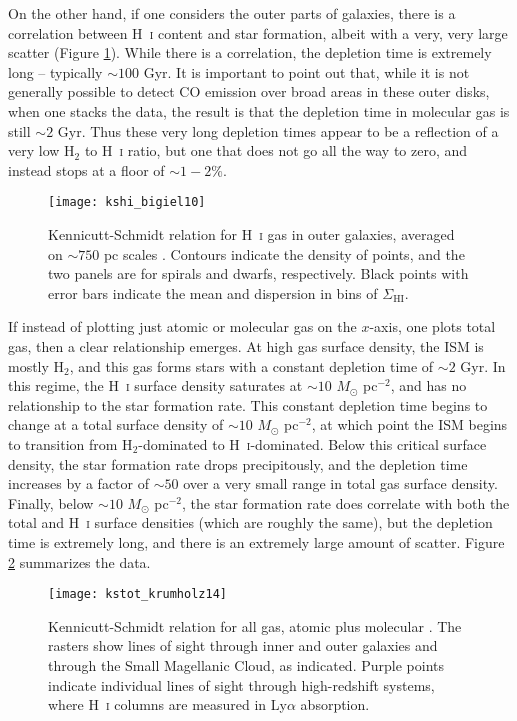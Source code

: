 On the other hand, if one considers the outer parts of galaxies, there is a correlation between H~\textsc{i} content and star formation, albeit with a very, very large scatter (Figure \ref{fig:kshi_bigiel10}). While there is a correlation, the depletion time is extremely long -- typically $\sim 100$ Gyr. It is important to point out that, while it is not generally possible to detect CO emission over broad areas in these outer disks, when one stacks the data, the result is that the depletion time in molecular gas is still $\sim 2$ Gyr. Thus these very long depletion times appear to be a reflection of a very low H$_2$ to H~\textsc{i} ratio, but one that does not go all the way to zero, and instead stops at a floor of $\sim 1-2\%$.

\begin{figure}
\texttt{[image: kshi\_bigiel10]}
\caption[Kennicutt-Schmidt relation for H~\textsc{i} gas in outer galaxies]{
\label{fig:kshi_bigiel10}
Kennicutt-Schmidt relation for H~\textsc{i} gas in outer galaxies, averaged on $\sim 750$ pc scales \citep{bigiel10a}. Contours indicate the density of points, and the two panels are for spirals and dwarfs, respectively. Black points with error bars indicate the mean and dispersion in bins of $\Sigma_{\mathrm{HI}}$.
}
\end{figure}

If instead of plotting just atomic or molecular gas on the $x$-axis, one plots total gas, then a clear relationship emerges. At high gas surface density, the ISM is mostly H$_2$, and this gas forms stars with a constant depletion time of $\sim 2$ Gyr. In this regime, the H~\textsc{i} surface density saturates at $\sim 10$ $M_\odot$ pc$^{-2}$, and has no relationship to the star formation rate. This constant depletion time begins to change at a total surface density of $\sim 10$ $M_\odot$ pc$^{-2}$, at which point the ISM begins to transition from H$_2$-dominated to H~\textsc{i}-dominated. Below this critical surface density, the star formation rate drops precipitously, and the depletion time increases by a factor of $\sim 50$ over a very small range in total gas surface density. Finally, below $\sim 10$ $M_\odot$ pc$^{-2}$, the star formation rate does correlate with both the total and H~\textsc{i} surface densities (which are roughly the same), but the depletion time is extremely long, and there is an extremely large amount of scatter. Figure \ref{fig:kstot_krumholz14} summarizes the data.

\begin{figure}
\texttt{[image: kstot\_krumholz14]}
\caption[Kennicutt-Schmidt relation for total gas in resolved galaxies]{
\label{fig:kstot_krumholz14}
Kennicutt-Schmidt relation for all gas, atomic plus molecular \citep{krumholz14c}. The rasters show lines of sight through inner and outer galaxies and through the Small Magellanic Cloud, as indicated. Purple points indicate individual lines of sight through high-redshift systems, where H~\textsc{i} columns are measured in Ly$\alpha$ absorption.
}
\end{figure}


